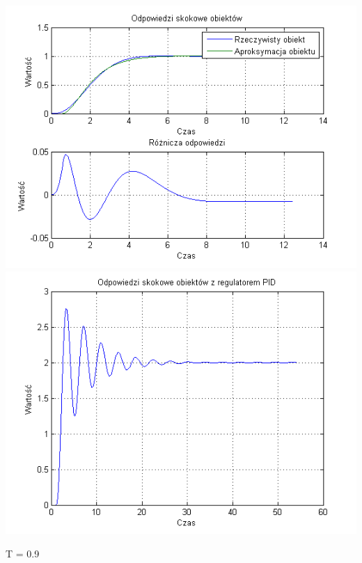\documentclass[10pt,a4paper]{article}
\begin{document}
\begin{center}
\includegraphics[scale=1]{images/dwa/skrypt_261.png}\\
\includegraphics[scale=1]{images/dwa/skrypt_262.png}\\
\end{center}
\newpage
T = 0.9
\end{document}
